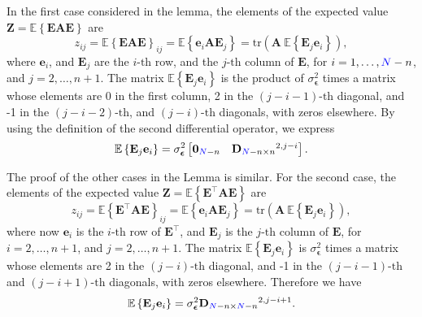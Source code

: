 \begin{pf}
In the first case considered in the lemma, the elements of the expected value $\mathbf{Z} = \mathbb{E} \left\{ \mathbf{E} \mathbf{A} \mathbf{E} \right\}$ are
\begin{equation} z_{ij} = \mathbb{E} \left\{ \mathbf{E} \mathbf{A} \mathbf{E} \right\}_{ij} = \mathbb{E} \left\{ \mathbf{e}_i \mathbf{A} \mathbf{E}_j \right\} = \mathrm{tr} \left( \mathbf{A} \ \mathbb{E} \left\{ \mathbf{E}_j \mathbf{e}_i \right\} \right) , \end{equation}
where $\mathbf{e}_i$, and $\mathbf{E}_j$ are the $i\text{-th}$ row, and the $j\text{-th}$ column of $\mathbf{E}$, for $i = 1, \ldots, \color{blue}N\color{black}-n$, and $j = 2, \ldots, n+1$.
The matrix $\mathbb{E} \left\{ \mathbf{E}_j \mathbf{e}_i \right\}$ is the product of $\sigma_{\bm{\epsilon}}^2$ times a matrix whose elements are 0 in the first column, 2 in the $(j-i-1) \text{-th}$ diagonal, and -1 in the $(j-i-2) \text{-th}$, and $(j-i) \text{-th}$ diagonals, with zeros elsewhere.
By using the definition of the second differential operator, we express
\begin{equation} \mathbb{E} \left\{ \mathbf{E}_j \mathbf{e}_i \right\} = \sigma_{\bm{\epsilon}}^2 \begin{bmatrix} \mathbf{0}_{\color{blue}N\color{black}-n} & \mathbf{D}_{\color{blue}N\color{black}-n \times n}^{2, j-i} \end{bmatrix}. \end{equation}

The proof of the other cases in the Lemma is similar. 
For the second case, the elements of the expected value $\mathbf{Z} = \mathbb{E} \left\{ \mathbf{E}^\top \mathbf{A} \mathbf{E} \right\}$ are
\begin{equation} z_{ij} = \mathbb{E} \left\{ \mathbf{E}^\top \mathbf{A} \mathbf{E} \right\}_{ij} = \mathbb{E} \left\{ \mathbf{e}_i \mathbf{A} \mathbf{E}_j \right\} = \mathrm{tr} \left( \mathbf{A} \ \mathbb{E} \left\{ \mathbf{E}_j \mathbf{e}_i \right\} \right) , \end{equation}
where now $\mathbf{e}_i$ is the $i\text{-th}$ row of $\mathbf{E}^\top$, and $\mathbf{E}_j$ is the $j\text{-th}$ column of $\mathbf{E}$, for $i = 2, \ldots, n+1$, and $j = 2, \ldots, n+1$.
The matrix $\mathbb{E} \left\{ \mathbf{E}_j \mathbf{e}_i \right\}$ is $\sigma_{\bm{\epsilon}}^2$ times a matrix whose elements are 2 in the $(j-i) \text{-th}$ diagonal, and -1 in the $(j-i-1) \text{-th}$ and $(j-i+1) \text{-th}$ diagonals, with zeros elsewhere.
Therefore we have
\begin{equation} \mathbb{E} \left\{ \mathbf{E}_j \mathbf{e}_i \right\} = \sigma_{\bm{\epsilon}}^2 \mathbf{D}_{\color{blue}N\color{black}-n \times \color{blue}N\color{black}-n}^{2,j-i+1}. \end{equation}


\end{pf}
